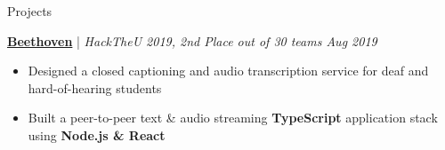\documentclass{resume/resume}
\begin{document}
\begin{rSection}{Projects}
  
  \href{https://devpost.com/software/beethoven-t9ud86}{\bf Beethoven} | {\em HackTheU 2019, 2nd Place out of 30 teams
  \hfill Aug 2019}
  \vspace{-6pt}
  \begin{itemize}[nosep]
    \item Designed a closed captioning and audio transcription service for deaf and hard-of-hearing students
    \item Built a peer-to-peer text \& audio streaming {\bf TypeScript} application stack using {\bf Node.js \& React}
  \end{itemize}

  
  

\end{rSection}
\end{document}
